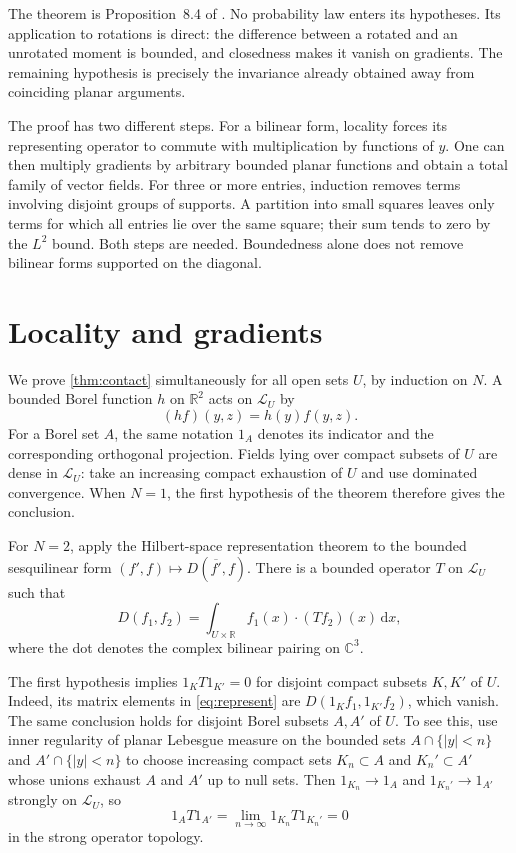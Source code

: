 \documentclass[11pt,letterpaper,reqno]{amsart}
\theoremstyle{definition}
\theoremstyle{remark}
\newcommand{\R}{\mathbb R}
\newcommand{\C}{\mathbb C}
\newcommand{\dd}{\,\mathrm d}
\begin{document}
The theorem is Proposition~8.4 of \cite{QEDCurrent}.
No probability law enters its hypotheses.
Its application to rotations is direct: the difference between a rotated and
an unrotated moment is bounded, and closedness makes it vanish on gradients.
The remaining hypothesis is precisely the invariance already obtained away
from coinciding planar arguments.

The proof has two different steps. For a bilinear form, locality forces its
representing operator to commute with multiplication by functions of $y$.
One can then multiply gradients by arbitrary bounded planar functions and
obtain a total family of vector fields. For three or more entries, induction
removes terms involving disjoint groups of supports. A partition into small
squares leaves only terms for which all entries lie over the same square;
their sum tends to zero by the $L^2$ bound. Both steps are needed. Boundedness
alone does not remove bilinear forms supported on the diagonal.

\section{Locality and gradients}

We prove \cref{thm:contact} simultaneously for all open sets $U$, by
induction on $N$. A bounded Borel function $h$ on $\R^2$ acts on
$\mathcal L_U$ by
\[
 (hf)(y,z)=h(y)f(y,z).
\]
For a Borel set $A$, the same notation $1_A$ denotes its indicator and the
corresponding orthogonal projection. Fields lying over compact subsets of
$U$ are dense in $\mathcal L_U$: take an increasing compact exhaustion of
$U$ and use dominated convergence. When $N=1$, the first hypothesis of the
theorem therefore gives the conclusion.

For $N=2$, apply the Hilbert-space representation theorem
\cite[Theorem 3.3]{Melrose} to the bounded
sesquilinear form $(f',f)\mapsto D(\overline{f'},f)$. There is a bounded
operator $T$ on $\mathcal L_U$ such that
\begin{equation}\label{eq:represent}
 D(f_1,f_2)=\int_{U\times\R}f_1(x)\cdot(Tf_2)(x)\dd x,
\end{equation}
where the dot denotes the complex bilinear pairing on $\C^3$.

The first hypothesis implies $1_KT1_{K'}=0$ for disjoint compact subsets
$K,K'$ of $U$. Indeed, its matrix elements in \eqref{eq:represent} are
$D(1_Kf_1,1_{K'}f_2)$, which vanish. The same conclusion holds for disjoint
Borel subsets $A,A'$ of $U$. To see this, use inner regularity of planar
Lebesgue measure on the bounded sets $A\cap\{|y|<n\}$ and
$A'\cap\{|y|<n\}$ to choose increasing compact sets $K_n\subset A$ and
$K_n'\subset A'$ whose unions exhaust $A$ and $A'$ up to null sets. Then
$1_{K_n}\to1_A$ and $1_{K_n'}\to1_{A'}$ strongly on $\mathcal L_U$, so
\[
 1_AT1_{A'}=\lim_{n\to\infty}1_{K_n}T1_{K_n'}=0
\]
in the strong operator topology.
\end{document}

